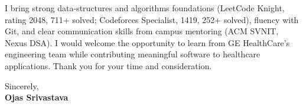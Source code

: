 \documentclass[a4paper,11pt]{article}
\begin{document}
I bring strong data-structures and algorithms foundations (LeetCode Knight, rating 2048, 711+ solved; Codeforces Specialist, 1419, 252+ solved), fluency with Git, and clear communication skills from campus mentoring (ACM SVNIT, Nexus DSA). I would welcome the opportunity to learn from GE HealthCare's engineering team while contributing meaningful software to healthcare applications. Thank you for your time and consideration.

Sincerely, \\
\vspace{8mm}
\textbf{Ojas Srivastava}
\end{document}
